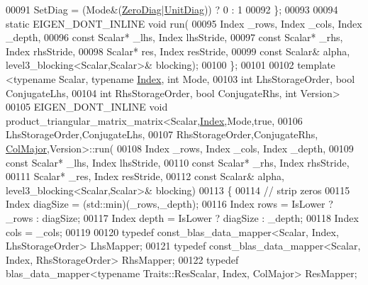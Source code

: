\begin{DoxyCode}
00091     SetDiag = (Mode&(\hyperlink{group__enums_gga39e3366ff5554d731e7dc8bb642f83cda884ff7240392e85aa6e4b3c957e36483}{ZeroDiag}|\hyperlink{group__enums_gga39e3366ff5554d731e7dc8bb642f83cdaddb72f888ac85d5a1c52333e54f9374b}{UnitDiag})) ? 0 : 1
00092   \};
00093 
00094   \textcolor{keyword}{static} EIGEN\_DONT\_INLINE \textcolor{keywordtype}{void} run(
00095     Index \_rows, Index \_cols, Index \_depth,
00096     \textcolor{keyword}{const} Scalar* \_lhs, Index lhsStride,
00097     \textcolor{keyword}{const} Scalar* \_rhs, Index rhsStride,
00098     Scalar* res,        Index resStride,
00099     \textcolor{keyword}{const} Scalar& alpha, level3\_blocking<Scalar,Scalar>& blocking);
00100 \};
00101 
00102 \textcolor{keyword}{template} <\textcolor{keyword}{typename} Scalar, \textcolor{keyword}{typename} \hyperlink{namespace_eigen_a62e77e0933482dafde8fe197d9a2cfde}{Index}, \textcolor{keywordtype}{int} Mode,
00103           \textcolor{keywordtype}{int} LhsStorageOrder, \textcolor{keywordtype}{bool} ConjugateLhs,
00104           \textcolor{keywordtype}{int} RhsStorageOrder, \textcolor{keywordtype}{bool} ConjugateRhs, \textcolor{keywordtype}{int} Version>
00105 EIGEN\_DONT\_INLINE \textcolor{keywordtype}{void} product\_triangular\_matrix\_matrix<Scalar,\hyperlink{namespace_eigen_a62e77e0933482dafde8fe197d9a2cfde}{Index},Mode,\textcolor{keyword}{true},
00106                                                         LhsStorageOrder,ConjugateLhs,
00107                                                         RhsStorageOrder,ConjugateRhs,
      \hyperlink{group__enums_ggaacded1a18ae58b0f554751f6cdf9eb13a0cbd4bdd0abcfc0224c5fcb5e4f6669a}{ColMajor},Version>::run(
00108     Index \_rows, Index \_cols, Index \_depth,
00109     \textcolor{keyword}{const} Scalar* \_lhs, Index lhsStride,
00110     \textcolor{keyword}{const} Scalar* \_rhs, Index rhsStride,
00111     Scalar* \_res,        Index resStride,
00112     \textcolor{keyword}{const} Scalar& alpha, level3\_blocking<Scalar,Scalar>& blocking)
00113   \{
00114     \textcolor{comment}{// strip zeros}
00115     Index diagSize  = (std::min)(\_rows,\_depth);
00116     Index rows      = IsLower ? \_rows : diagSize;
00117     Index depth     = IsLower ? diagSize : \_depth;
00118     Index cols      = \_cols;
00119     
00120     \textcolor{keyword}{typedef} const\_blas\_data\_mapper<Scalar, Index, LhsStorageOrder> LhsMapper;
00121     \textcolor{keyword}{typedef} const\_blas\_data\_mapper<Scalar, Index, RhsStorageOrder> RhsMapper;
00122     \textcolor{keyword}{typedef} blas\_data\_mapper<typename Traits::ResScalar, Index, ColMajor> ResMapper;

\end{DoxyCode}
